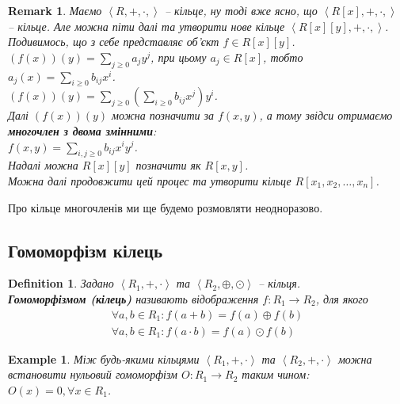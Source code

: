 \documentclass[a4paper, 10pt]{article}
\theoremstyle{theoremdd}
\theoremstyle{theoremdd}
\newtheorem{definition}[theorem]{Definition}
\theoremstyle{theoremdd}
\theoremstyle{theoremdd}
\theoremstyle{theoremdd}
\newtheorem{example}[theorem]{Example}
\theoremstyle{theoremdd}
\theoremstyle{theoremdd}
\theoremstyle{theoremdd}
\theoremstyle{theoremdd}
\theoremstyle{theoremdd}
\theoremstyle{theoremdd}
\newtheorem{remark}[theorem]{Remark}
\theoremstyle{theoremdd}
\theoremstyle{theoremdd}
\theoremstyle{theoremdd}
\theoremstyle{theoremdd}
\begin{document}
\begin{remark}
Маємо $\left<R,+,\cdot,\right>$ -- кільце, ну тоді вже ясно, що $\left<R[x],+,\cdot,\right>$ -- кільце. Але можна піти далі та утворити нове кільце $\left<R[x][y],+,\cdot,\right>$. Подивимось, що з себе представляє об'єкт $f \in R[x][y]$.\\
$(f(x))(y) = \displaystyle\sum_{j \geq 0} a_j y^j$, при цьому $a_j \in R[x]$, тобто $a_j(x) = \displaystyle\sum_{i \geq 0} b_{ij} x^i$.\\
$(f(x))(y) = \displaystyle\sum_{j \geq 0} \left(\sum_{i \geq 0} b_{ij} x^j\right) y^i$.\\
Далі $(f(x))(y)$ можна позначити за $f(x,y)$, а тому звідси отримаємо \textbf{многочлен з двома змінними}:\\
$f(x,y) = \displaystyle\sum_{i,j \geq 0} b_{ij} x^i y^j$.\\
Надалі можна $R[x][y]$ позначити як $R[x,y]$.
\bigskip \\
Можна далі продовжити цей процес та утворити кільце $R[x_1,x_2,\dots,x_n]$.
\end{remark}

Про кільце многочленів ми ще будемо розмовляти неодноразово.

\subsection{Гомоморфізм кілець}
\begin{definition}
Задано $\left<R_1, +, \cdot \right>$ та $\left<R_2, \oplus, \odot \right>$ -- кільця.\\
\textbf{Гомоморфізмом (кілець)} називають відображення $f \colon R_1 \to R_2$, для якого
\begin{align*}
\forall a,b \in R_1: f(a+b) = f(a) \oplus f(b) \\
\forall a,b \in R_1: f(a \cdot b) = f(a) \odot f(b)
\end{align*}
\end{definition}

\begin{example}
Між будь-якими кільцями $\left<R_1,+,\cdot\right>$ та $\left<R_2,+,\cdot \right>$ можна встановити нульовий гомоморфізм $O \colon R_1 \to R_2$ таким чином: $O(x) = 0, \forall x \in R_1$.
\iffalse До речі кажучи, $\ker O = R_1$, а тому даний гомоморфізм -- не ін'єктивний. \fi
\end{example}
\end{document}
